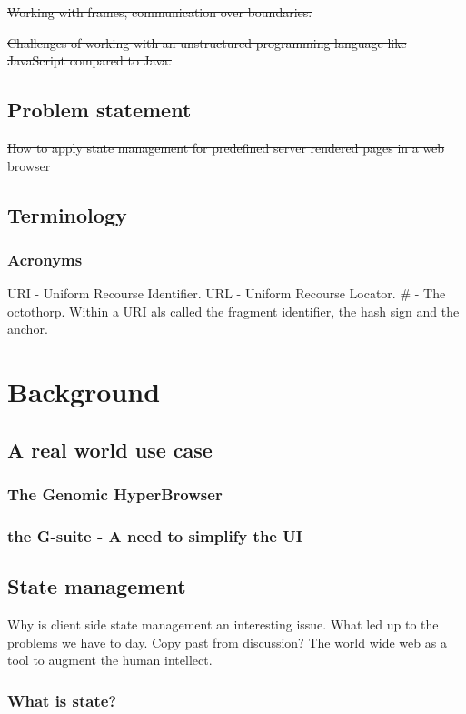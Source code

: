 \documentclass[english]{ifimaster}
\begin{document}
\sout{Working with frames, communication over boundaries.}

\sout{Challenges of working with an unstructured programming language like JavaScript compared to Java.}




\section{Problem statement}
\sout{How to apply state management for predefined server rendered pages in a web browser}

\section{Terminology}

\subsection{Acronyms}
URI - Uniform Recourse Identifier.
URL - Uniform Recourse Locator. 
\#  - The octothorp. Within a URI als called the fragment identifier, the hash sign and the anchor. 



\chapter{Background}
\section{A real world use case}
\subsection{The Genomic HyperBrowser}
\subsection{the G-suite - A need to simplify the UI}

\section{State management}
Why is client side state management an interesting issue. What led up to the problems we have to day. Copy past from discussion? The world wide web as a tool to augment the human intellect.
\subsection{What is state?}
\label{sec:state}
\end{document}
